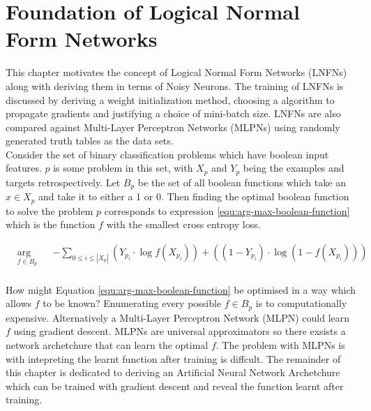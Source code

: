 \chapter{Foundation of Logical Normal Form Networks}\label{C:foundation-of-lnfns}
This chapter motivates the concept of Logical Normal Form Networks (LNFNs) along with deriving them in terms of Noisy Neurons. The training of LNFNs is discussed by deriving a weight initialization method, choosing a algorithm to propagate gradients and justifying a choice of mini-batch size. LNFNs are also compared against Multi-Layer Perceptron Networks (MLPNs) using randomly generated truth tables as the data sets.\\

Consider the set of binary classification problems which have boolean input features. $p$ is some problem in this set, with $X_p$ and $Y_p$ being the examples and targets retrospectively. Let $B_p$ be the set of all boolean functions which take an $x \in X_p$ and take it to either a 1 or 0. Then finding the optimal boolean function to solve the problem $p$ corresponds to expression \ref{equ:arg-max-boolean-function} which is the function $f$ with the smallest cross entropy loss.

\begin{equation}
\label{equ:arg-max-boolean-function}
\begin{aligned}
& \underset{f \in B_p}{\text{arg min}}
& & -\sum_{0 \leq i \leq |X_p|} (Y_{p_i} \cdot \log f(X_{p_i})) + ((1 - Y_{p_i}) \cdot \log(1 - f(X_{p_i})))  \\
\end{aligned}
\end{equation}

How might Equation \ref{equ:arg-max-boolean-function} be optimised in a way which allows $f$ to be known? Enumerating every possible $f \in B_p$ is to computationally expensive. Alternatively a Multi-Layer Perceptron Network (MLPN) could learn $f$ using gradient descent. MLPNs are universal approximators so there exsists a network archetchure that can learn the optimal $f$. The problem with MLPNs is with intepreting the learnt function after training is diffcult. The remainder of this chapter is dedicated to deriving an Artificial Neural Network Archetchure which can be trained with gradient descent and reveal the function learnt after training.\\

